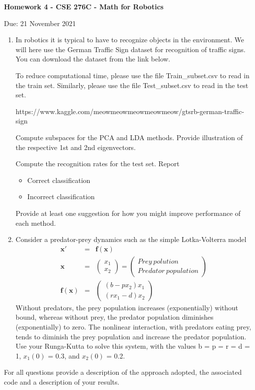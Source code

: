 \documentclass[12pt]{article}
\begin{document}
\centerline{\bf Homework 4 - CSE 276C - Math for Robotics}
\centerline{Due: 21 November 2021}

\begin{enumerate}
\item In robotics it is typical to have to recognize objects in the environment.
  We will here use the German Traffic Sign dataset for recognition of traffic signs. You can download the dataset from the link below.

  To reduce computational time, please use the file Train\_subset.csv to read in the train set. Similarly, please use the file Test\_subset.csv to read in the test set.

https://www.kaggle.com/meowmeowmeowmeowmeow/gtsrb-german-traffic-sign

   Compute subspaces for the PCA and LDA methods. Provide
  illustration of the respective 1st and 2nd eigenvectors.
  

  Compute the recognition rates for the test set. Report
  \begin{itemize}
  \item Correct classification
  \item Incorrect classification
  \end{itemize}

  Provide at least one suggestion for how you might improve performance of each method.

\item Consider a predator-prey dynamics such as the simple
  Lotka-Volterra model
  \begin{eqnarray*}
    \mathbf{x}' &=& \mathbf{f}(\mathbf{x})\\
    \mathbf{x} &=& \left( \begin{array}{c}  x_1 \\ x_ 2 \end{array}
    \right) = \left( \begin{array}{c} Prey~polution \\ Predator~population \end{array}\right)\\
    \mathbf{f}(\mathbf{x}) &=& \left( \begin{array}{c} (b - p x_2) x_1 \\
                                        (r x_1 - d) x_2\end{array}\right)
  \end{eqnarray*}
  Without predators, the prey population increases (exponentially)
  without bound, whereas without prey, the predator population
  diminishes (exponentially) to zero. The nonlinear interaction, with
  predators eating prey, tends to diminish the prey population and
  increase the predator population. Use your Runga-Kutta to solve this
  system, with the values b = p = r = d = 1, $x_1(0)$ = 0.3, and $x_2(0)$ =
  0.2.
  
\end{enumerate}
For all questions provide a description of the approach adopted, the
associated code and a description of your results. 


\end{document}
